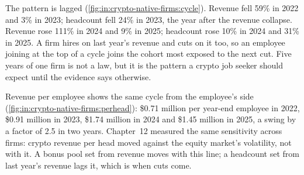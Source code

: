 The pattern is lagged (\cref{fig:in:crypto-native-firms:cycle}). Revenue fell 59\% in 2022 and 3\% in 2023; headcount
fell 24\% in 2023, the year after the revenue collapse. Revenue rose 111\% in 2024 and 9\% in 2025; headcount rose 10\% in
2024 and 31\% in 2025. A firm hires on last year's revenue and cuts on it too, so an employee joining at the top of a cycle
joins the cohort most exposed to the next cut. Five years of one firm is not a law, but it is the pattern a crypto job
seeker should expect until the evidence says otherwise.

\begin{omfigure}

\label{fig:in:crypto-native-firms:cycle}
\end{omfigure}

Revenue per employee shows the same cycle from the employee's side (\cref{fig:in:crypto-native-firms:perhead}): \$0.71
million per year-end employee in 2022, \$0.91 million in 2023, \$1.74 million in 2024 and \$1.45 million in 2025, a
swing by a factor of 2.5 in two years. Chapter~12 measured the same sensitivity across firms: crypto revenue per head
moved against the equity market's volatility, not with it. A bonus pool set from revenue moves with this line; a
headcount set from last year's revenue lags it, which is when cuts come.


